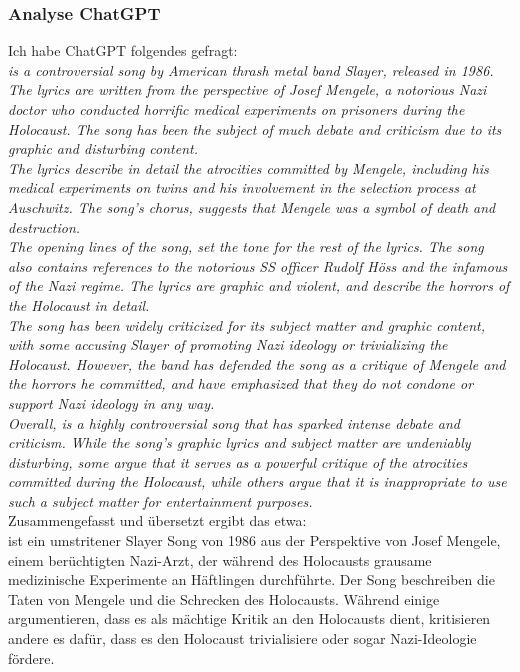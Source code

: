 \documentclass[twocolumn,10pt]{article}
\begin{document}
			\subsubsection{Analyse ChatGPT}
			Ich habe ChatGPT\cite{ChatGPT} folgendes gefragt: \vspace{10pt}\\
			\textit{ is a controversial song by American thrash metal band Slayer, released in 1986. The lyrics are written from the perspective of Josef Mengele, a notorious Nazi doctor who conducted horrific medical experiments on prisoners during the Holocaust. The song has been the subject of much debate and criticism due to its graphic and disturbing content.}\\
			\textit{The lyrics describe in detail the atrocities committed by Mengele, including his medical experiments on twins and his involvement in the selection process at Auschwitz. The song's chorus,  suggests that Mengele was a symbol of death and destruction.}\\
			\textit{The opening lines of the song,  set the tone for the rest of the lyrics. The song also contains references to the notorious SS officer Rudolf Höss and the infamous  of the Nazi regime. The lyrics are graphic and violent, and describe the horrors of the Holocaust in detail.}\\
			\textit{The song has been widely criticized for its subject matter and graphic content, with some accusing Slayer of promoting Nazi ideology or trivializing the Holocaust. However, the band has defended the song as a critique of Mengele and the horrors he committed, and have emphasized that they do not condone or support Nazi ideology in any way.}\\
			\textit{Overall,  is a highly controversial song that has sparked intense debate and criticism. While the song's graphic lyrics and subject matter are undeniably disturbing, some argue that it serves as a powerful critique of the atrocities committed during the Holocaust, while others argue that it is inappropriate to use such a subject matter for entertainment purposes.}\\
			Zusammengefasst und übersetzt ergibt das etwa:\\
			 ist ein umstritener Slayer Song von 1986 aus der Perspektive von Josef Mengele, einem berüchtigten Nazi-Arzt, der während des Holocausts grausame medizinische Experimente an Häftlingen durchführte. Der Song beschreiben die Taten von Mengele und die Schrecken des Holocausts. Während einige argumentieren, dass es als mächtige Kritik an den Holocausts dient, kritisieren andere es dafür, dass es den Holocaust trivialisiere oder sogar Nazi-Ideologie fördere.
\end{document}
